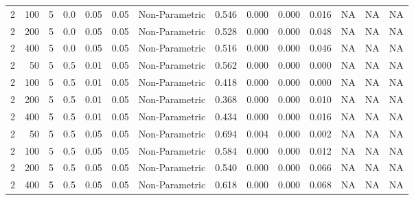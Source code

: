 \begin{table}
{{\begin{tabular}{rrrrrrllllllll}
\hspace{1em}2 & 100 & 5 & 0.0 & 0.05 & 0.05 & Non-Parametric & 0.546 & 0.000 & 0.000 & 0.016 & NA & NA & NA\\
\hspace{1em}2 & 200 & 5 & 0.0 & 0.05 & 0.05 & Non-Parametric & 0.528 & 0.000 & 0.000 & 0.048 & NA & NA & NA\\
\hspace{1em}2 & 400 & 5 & 0.0 & 0.05 & 0.05 & Non-Parametric & 0.516 & 0.000 & 0.000 & 0.046 & NA & NA & NA\\
\hspace{1em}2 & 50 & 5 & 0.5 & 0.01 & 0.05 & Non-Parametric & 0.562 & 0.000 & 0.000 & 0.000 & NA & NA & NA\\
\hspace{1em}2 & 100 & 5 & 0.5 & 0.01 & 0.05 & Non-Parametric & 0.418 & 0.000 & 0.000 & 0.000 & NA & NA & NA\\
\hspace{1em}2 & 200 & 5 & 0.5 & 0.01 & 0.05 & Non-Parametric & 0.368 & 0.000 & 0.000 & 0.010 & NA & NA & NA\\
\hspace{1em}2 & 400 & 5 & 0.5 & 0.01 & 0.05 & Non-Parametric & 0.434 & 0.000 & 0.000 & 0.016 & NA & NA & NA\\
\hspace{1em}2 & 50 & 5 & 0.5 & 0.05 & 0.05 & Non-Parametric & 0.694 & 0.004 & 0.000 & 0.002 & NA & NA & NA\\
\hspace{1em}2 & 100 & 5 & 0.5 & 0.05 & 0.05 & Non-Parametric & 0.584 & 0.000 & 0.000 & 0.012 & NA & NA & NA\\
\hspace{1em}2 & 200 & 5 & 0.5 & 0.05 & 0.05 & Non-Parametric & 0.540 & 0.000 & 0.000 & 0.066 & NA & NA & NA\\
\hspace{1em}2 & 400 & 5 & 0.5 & 0.05 & 0.05 & Non-Parametric & 0.618 & 0.000 & 0.000 & 0.068 & NA & NA & NA\\
\bottomrule
\end{tabular}
}}
 \end{table}
